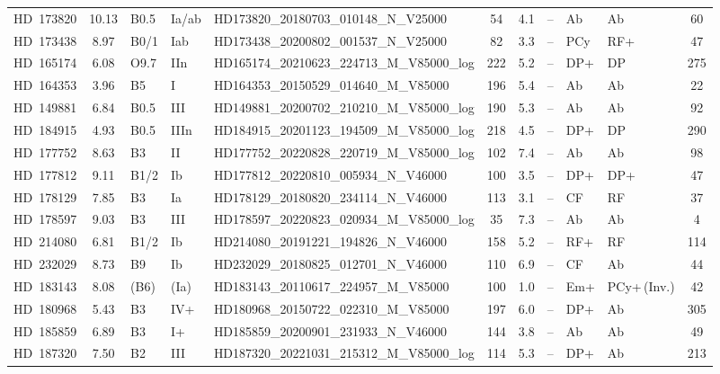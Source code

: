 {\begin{landscape}
\begin{longtable}{lclllcclllc}
\noalign{\smallskip}
HD~173820 & 10.13 & B0.5 & Ia/ab & HD173820\_20180703\_010148\_N\_V25000 & 54 & 4.1 & -- & Ab & Ab & 60 \\
\noalign{\smallskip}
HD~173438 & 8.97 & B0/1 & Iab & HD173438\_20200802\_001537\_N\_V25000 & 82 & 3.3 & -- & PCy & RF+ & 47 \\
\noalign{\smallskip}
HD~165174 & 6.08 & O9.7 & IIn & HD165174\_20210623\_224713\_M\_V85000\_log & 222 & 5.2 & -- & DP+ & DP & 275 \\
\noalign{\smallskip}
HD~164353 & 3.96 & B5 & I & HD164353\_20150529\_014640\_M\_V85000 & 196 & 5.4 & -- & Ab & Ab & 22 \\
\noalign{\smallskip}
HD~149881 & 6.84 & B0.5 & III & HD149881\_20200702\_210210\_M\_V85000\_log & 190 & 5.3 & -- & Ab & Ab & 92 \\
\noalign{\smallskip}
HD~184915 & 4.93 & B0.5 & IIIn & HD184915\_20201123\_194509\_M\_V85000\_log & 218 & 4.5 & -- & DP+ & DP & 290 \\
\noalign{\smallskip}
HD~177752 & 8.63 & B3 & II & HD177752\_20220828\_220719\_M\_V85000\_log & 102 & 7.4 & -- & Ab & Ab & 98 \\
\noalign{\smallskip}
HD~177812 & 9.11 & B1/2 & Ib & HD177812\_20220810\_005934\_N\_V46000 & 100 & 3.5 & -- & DP+ & DP+ & 47 \\
\noalign{\smallskip}
HD~178129 & 7.85 & B3 & Ia & HD178129\_20180820\_234114\_N\_V46000 & 113 & 3.1 & -- & CF & RF & 37 \\
\noalign{\smallskip}
HD~178597 & 9.03 & B3 & III & HD178597\_20220823\_020934\_M\_V85000\_log & 35 & 7.3 & -- & Ab & Ab & 4 \\
\noalign{\smallskip}
HD~214080 & 6.81 & B1/2 & Ib & HD214080\_20191221\_194826\_N\_V46000 & 158 & 5.2 & -- & RF+ & RF & 114 \\
\noalign{\smallskip}
HD~232029 & 8.73 & B9 & Ib & HD232029\_20180825\_012701\_N\_V46000 & 110 & 6.9 & -- & CF & Ab & 44 \\
\noalign{\smallskip}
HD~183143 & 8.08 & (B6) & (Ia) & HD183143\_20110617\_224957\_M\_V85000 & 100 & 1.0 & -- & Em+ & PCy+\,(Inv.) & 42 \\
\noalign{\smallskip}
HD~180968 & 5.43 & B3 & IV+ & HD180968\_20150722\_022310\_M\_V85000 & 197 & 6.0 & -- & DP+ & Ab & 305 \\
\noalign{\smallskip}
HD~185859 & 6.89 & B3 & I+ & HD185859\_20200901\_231933\_N\_V46000 & 144 & 3.8 & -- & Ab & Ab & 49 \\
\noalign{\smallskip}
HD~187320 & 7.50 & B2 & III & HD187320\_20221031\_215312\_M\_V85000\_log & 114 & 5.3 & -- & DP+ & Ab & 213 \\

\end{longtable}
\end{landscape}}
